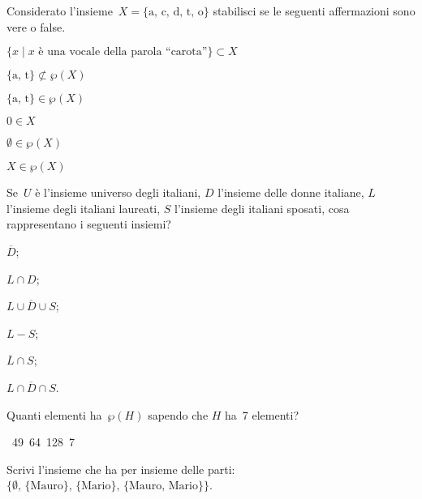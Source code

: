\begin{esercizio}
Considerato l'insieme~$X=\{\text{a, c, d, t, o}\}$ stabilisci se le seguenti affermazioni sono vere o false.

\TabPositions{8cm}
\begin{enumeratea}
\item $\{x\mid x\text{ è una vocale della parola ``carota''}\} \subset X$ \tab\boxV\quad\boxF
\item $\{\text{a, t}\}\not\subset \wp (X)$ \tab\boxV\quad\boxF
\item $\{\text{a, t}\}\in \wp (X)$ \tab\boxV\quad\boxF
\item $0\in X$ \tab\boxV\quad\boxF
\item $\emptyset \in \wp (X)$ \tab\boxV\quad\boxF
\item $X\in \wp (X)$ \tab\boxV\quad\boxF
\end{enumeratea}
\end{esercizio}

\pagebreak
\begin{esercizio}
Se~$U$ è l'insieme universo degli italiani, $D$ l'insieme delle donne italiane,
$L$ l'insieme degli italiani laureati, $S$ l'insieme degli italiani sposati, cosa rappresentano
i seguenti insiemi?
\begin{multicols}{3}
\begin{enumeratea}
\item $\overline{D}$;
\item $L\cap D$;
\item $\overline{{L\cup D\cup S}}$;
\item $L-S$;
\item $\overline{{L}}\cap S$;
\item $\overline{{L\cap D\cap S}}$.
\end{enumeratea}
\end{multicols}
\end{esercizio}


\begin{esercizio}
Quanti elementi ha~$\wp (H)$ sapendo che $H$ ha~7 elementi?
\begin{center}
 \boxA\quad~49\quad\boxB\quad~64\quad\boxC\quad~128\quad\boxD\quad~7\quad\boxE{}
\end{center}
\end{esercizio}

\begin{esercizio}
Scrivi l'insieme che ha per insieme delle parti:
$\{\emptyset\text{, }\{\text{Mauro}\}\text{, }\{\text{Mario}\}\text{, }\{\text{Mauro, Mario}\}\}$.
\end{esercizio}


